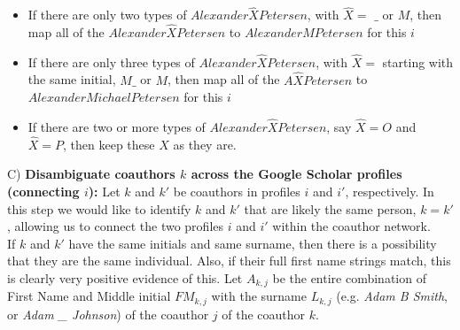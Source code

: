  \begin{itemize}
 \item If there are only two  types of $Alexander \hat X Petersen$, with $\hat X=$ $\_$ or $M$, then map all of the $Alexander \hat X Petersen$ to $Alexander M Petersen$ for this $i$
 \item If there are only three types of $Alexander \hat X Petersen$, with $\hat X=$ starting with the same initial, $M\_$ or $M$, then map all of the $A\hat X Petersen$ to $Alexander Michael Petersen$ for this $i$
 \item If there are two or more types of $Alexander \hat X Petersen$, say $\hat X=O$ and $\hat X=P$, then keep these $X$ as they are.
 
  
\end{itemize}

C)  {\bf Disambiguate coauthors $k$ across the Google Scholar profiles (connecting $i$):} Let  $k$ and $k'$ be coauthors in profiles $i$ and $i'$, respectively.   In this step we would like to identify $k$ and $k'$ that are likely the same person, $k=k'$, allowing us to connect the two profiles $i$ and $i'$ within the coauthor network.\\

 If $k$ and $k'$ have the same initials and same surname, then there is a possibility that they are the same individual. Also, if their full first name strings match, this is clearly very positive evidence of this. Let $A_{k,j}$ be the entire combination of First Name and Middle initial $FM_{k,j}$ with the surname $L_{k,j}$ (e.g. {\it Adam B Smith}, or {\it Adam \_ Johnson}) of the coauthor $j$ of the coauthor $k$. 

